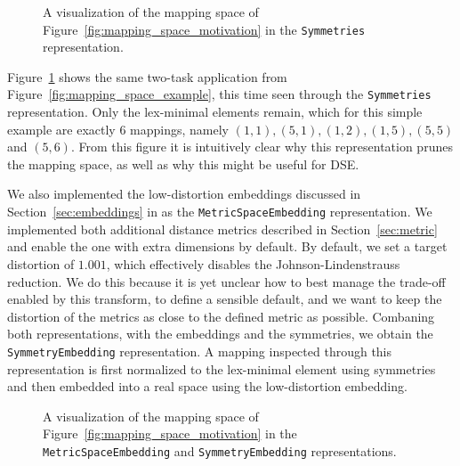 \begin{figure}[h]
	\centering
  \resizebox{0.55\textwidth}{!}{
    \begin{tikzpicture}[x=1pt,y=1pt]
      
    \end{tikzpicture}
    }
	\caption{A visualization of the mapping space of Figure~\ref{fig:mapping_space_motivation} in the \texttt{Symmetries} representation.}
	\label{fig:example_space_symmetries}
\end{figure}

Figure~\ref{fig:example_space_symmetries} shows the same two-task application from Figure~\ref{fig:mapping_space_example}, this time seen through the \texttt{Symmetries} representation.
Only the lex-minimal elements remain, which for this simple example are exactly $6$ mappings, namely $(1,1), (5,1), (1,2), (1,5), (5,5)$ and $(5,6)$. 
From this figure it is intuitively clear why this representation prunes the mapping space, as well as why this might be useful for \ac{DSE}.

We also implemented the low-distortion embeddings discussed in Section~\ref{sec:embeddings} in \mocasin as the \texttt{MetricSpaceEmbedding} representation.
We implemented both additional distance metrics described in Section~\ref{sec:metric} and enable the one with extra dimensions by default.
By default, we set a target distortion of $1.001$, which effectively disables the Johnson-Lindenstrauss reduction. 
We do this because it is yet unclear how to best manage the trade-off enabled by this transform, to define a sensible default, and we want to keep the distortion of the metrics as close to the defined metric as possible.
Combaning both representations, with the embeddings and the symmetries, we obtain the \texttt{SymmetryEmbedding} representation.
A mapping inspected through this representation is first normalized to the lex-minimal element using symmetries and then embedded into a real space using the low-distortion embedding.

\begin{figure}[h]
	\centering
  \resizebox{0.40\textwidth}{!}{
    \begin{tikzpicture}[x=1pt,y=1pt]
      
    \end{tikzpicture}
  }
  \resizebox{0.40\textwidth}{!}{
    \begin{tikzpicture}[x=1pt,y=1pt]
    
    \end{tikzpicture}
  }

	\caption{A visualization of the mapping space of Figure~\ref{fig:mapping_space_motivation} in the \texttt{MetricSpaceEmbedding} and \texttt{SymmetryEmbedding} representations.}
	\label{fig:example_space_embedding}
\end{figure}

